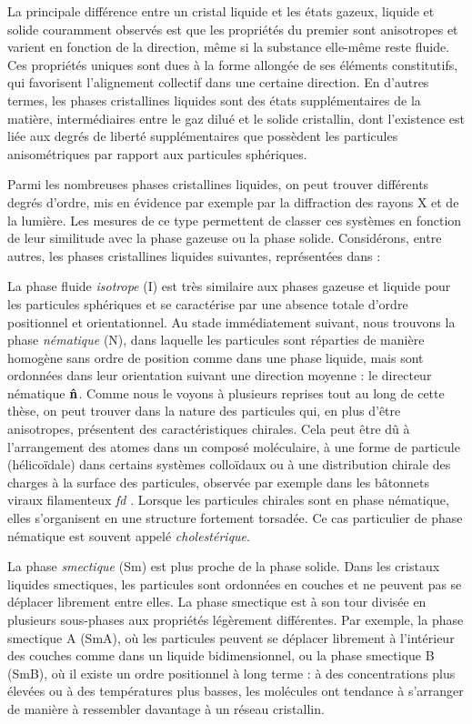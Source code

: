 La principale différence entre un cristal liquide et les états gazeux, liquide et solide couramment observés est que les propriétés du premier sont anisotropes et varient en fonction de la direction, même si la substance elle-même reste fluide. Ces propriétés uniques sont dues à la forme allongée de ses éléments constitutifs, qui favorisent l'alignement collectif dans une certaine direction. En d'autres termes, les phases cristallines liquides sont des états supplémentaires de la matière, intermédiaires entre le gaz dilué et le solide cristallin, dont l'existence est liée aux degrés de liberté supplémentaires que possèdent les particules anisométriques par rapport aux particules sphériques.


Parmi les nombreuses phases cristallines liquides, on peut trouver différents degrés d'ordre, mis en évidence par exemple par la diffraction des rayons X et de la lumière. Les mesures de ce type permettent de classer ces systèmes en fonction de leur similitude avec la phase gazeuse ou la phase solide. Considérons, entre autres, les phases cristallines liquides suivantes, représentées dans  :

La phase fluide {\em isotrope} (I) est très similaire aux phases gazeuse et liquide pour les particules sphériques et se caractérise par une absence totale d'ordre positionnel et orientationnel. Au stade immédiatement suivant, nous trouvons la phase {\em nématique} (N), dans laquelle les particules sont réparties de manière homogène sans ordre de position comme dans une phase liquide, mais sont ordonnées dans leur orientation suivant une direction moyenne : le directeur nématique ${\bf \hat{n}}$. Comme nous le voyons à plusieurs reprises tout au long de cette thèse, on peut trouver dans la nature des particules qui, en plus d'être anisotropes, présentent des caractéristiques chirales. Cela peut être dû à l'arrangement des atomes dans un composé moléculaire, à une forme de particule (hélicoïdale) dans certains systèmes colloïdaux ou à une distribution chirale des charges à la surface des particules, observée par exemple dans  les bâtonnets viraux filamenteux {\em fd} \cite{Gibaud_2017}. Lorsque les particules chirales sont en phase nématique, elles s'organisent en une structure fortement torsadée. Ce cas particulier de phase nématique est souvent appelé {\em cholestérique}.

La phase {\em smectique} (Sm) est plus proche de la phase solide. Dans les cristaux liquides smectiques, les particules sont ordonnées en couches et ne peuvent pas se déplacer librement entre elles. La phase smectique est à son tour divisée en plusieurs sous-phases aux propriétés légèrement différentes. Par exemple, la phase smectique A (SmA), où les particules peuvent se déplacer librement à l'intérieur des couches comme dans un liquide bidimensionnel, ou la phase smectique B (SmB), où il existe un ordre positionnel à long terme : à des concentrations plus élevées ou à des températures plus basses, les molécules ont tendance à s'arranger de manière à ressembler davantage à un réseau cristallin.


